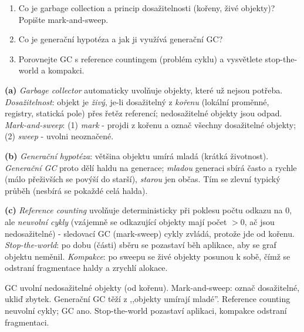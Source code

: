\begin{zadani}
\begin{enumerate}[label=(\alph*)]
  \item {} Co je garbage collection a princip dosažitelnosti (kořeny, živé objekty)? Popište mark-and-sweep.
  \item {} Co je generační hypotéza a jak ji využívá generační GC?
  \item {} Porovnejte GC s reference countingem (problém cyklu) a vysvětlete stop-the-world a kompakci.
\end{enumerate}
\end{zadani}

\begin{reseni}
\textbf{(a)} \emph{Garbage collector} automaticky uvolňuje objekty, které už nejsou potřeba. \emph{Dosažitelnost}: objekt je \emph{živý}, je-li dosažitelný z \emph{kořenu} (lokální proměnné, registry, statická pole) přes řetěz referencí; nedosažitelné objekty jsou odpad. \emph{Mark-and-sweep}: (1) \emph{mark} - projdi z kořenu a označ všechny dosažitelné objekty; (2) \emph{sweep} - uvolni neoznačené.

\textbf{(b)} \emph{Generační hypotéza}: většina objektu umírá mladá (krátká životnost). \emph{Generační GC} proto dělí haldu na generace; \emph{mladou} generaci sbírá často a rychle (málo přeživších se povýší do starší), \emph{starou} jen občas. Tím se zlevní typický průběh (nesbírá se pokaždé celá halda).

\textbf{(c)} \emph{Reference counting} uvolňuje deterministicky při poklesu počtu odkazu na 0, ale \emph{neuvolní cykly} (vzájemně se odkazující objekty mají počet $>0$, ač jsou nedosažitelné) - sledovací GC (mark-sweep) cykly zvládá, protože jde od kořenu. \emph{Stop-the-world}: po dobu (části) sběru se pozastaví běh aplikace, aby se graf objektu neměnil. \emph{Kompakce}: po sweepu se živé objekty posunou k sobě, čímž se odstraní fragmentace haldy a zrychlí alokace.
\end{reseni}

\begin{jadro}
GC uvolní nedosažitelné objekty (od kořenu). Mark-and-sweep: označ dosažitelné, ukliď zbytek. Generační GC těží z ,,objekty umírají mladé''. Reference counting neuvolní cykly; GC ano. Stop-the-world pozastaví aplikaci, kompakce odstraní fragmentaci.
\end{jadro}

